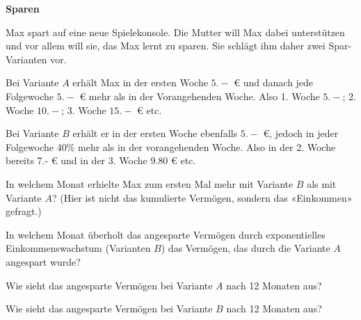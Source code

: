 
\bbwActAufgabenNr{} \textbf{Sparen}

Max spart auf eine neue Spielekonsole. Die Mutter will Max dabei unterstützen und vor allem will sie, das Max lernt zu sparen.
Sie schlägt ihm daher zwei Spar-Varianten vor.

Bei Variante $A$ erhält Max in der ersten Woche $5.-$ \euro{} und danach jede Folgewoche $5.-$ \euro{} mehr als in der Vorangehenden Woche. Also 1. Woche $5.-$; 2. Woche $10.-$; 3. Woche $15.-$ \euro{} etc.

Bei Variante $B$ erhält er in der ersten Woche ebenfalls $5.-$ \euro{}, jedoch in jeder Folgewoche 40\% mehr als in der vorangehenden Woche. Also in der 2. Woche \zB bereits 7.- \euro{} und in der 3. Woche $9.80$ \euro{} etc.


\begin{bbwAufgabenBlock}
\item In welchem Monat erhielte Max zum ersten Mal mehr mit Variante $B$ als mit Variante $A$? (Hier ist nicht das kumulierte Vermögen, sondern das «Einkommen» gefragt.)

\item In welchem Monat überholt das angesparte Vermögen durch exponentielles Einkommenswachstum (Varianten $B$) das Vermögen, das durch die Variante $A$ angespart wurde?

\item Wie sieht das angesparte Vermögen bei Variante $A$ nach 12 Monaten aus?

\item Wie sieht das angesparte Vermögen bei Variante $B$ nach 12 Monaten aus?
\end{bbwAufgabenBlock}
\platzFuerBerechnungenBisEndeSeite{}



\newpage
